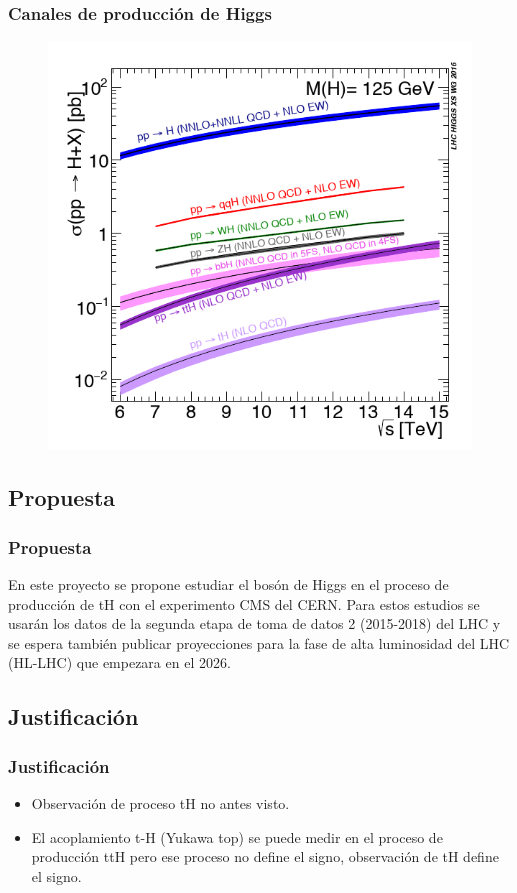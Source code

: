 \documentclass[11pt]{beamer}
\begin{document}
\begin{frame}
\frametitle{Canales de producci\'on de Higgs}
\begin{center}
\begin{figure}
\includegraphics[scale=0.5]{yuk.png}
\end{figure}
\end{center}
\end{frame}




\begin{frame}
\section{Propuesta}
\frametitle{Propuesta}
En este proyecto se propone estudiar el bosón de Higgs en el proceso de producción de
tH con el experimento CMS del CERN. Para estos estudios se usarán los datos de la
segunda etapa de toma de datos 2 (2015-2018) del LHC y se espera también publicar proyecciones para la fase
de alta luminosidad del LHC (HL-LHC) que empezara en el 2026.

\end{frame}

\begin{frame}
\section{Justificaci\'on}
\frametitle{Justificación}
\begin{itemize}
\item Observación de proceso tH no antes visto.
\item El acoplamiento t-H (Yukawa top)  se puede medir en el proceso de producción ttH pero ese proceso no define el signo,  observación de tH define el signo.  
\end{itemize}
\end{frame}
\end{document}

